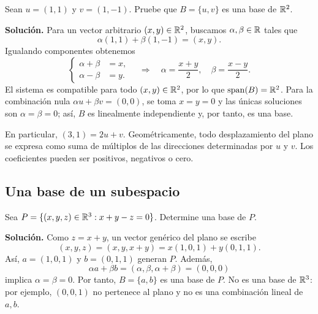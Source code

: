 \documentclass[compacto,10pt]{pubciencias-notas}
\begin{document}
\begin{ejem}\label{sem10cl01:planoR2}
    Sean $u=(1,1)$ y $v=(1,-1)$. Pruebe que $B=\{u,v\}$ es una base
    de $\mathbb{R}^2$.

    \textbf{Solución.} Para un vector arbitrario $(x,y)\in\mathbb{R}^2$, buscamos
    $\alpha,\beta\in\mathbb{R}$ tales que
    \[
        \alpha(1,1)+\beta(1,-1)=(x,y).
    \]
    Igualando componentes obtenemos
    \[
        \left\{\begin{aligned}\alpha+\beta&=x,\\\alpha-\beta&=y.\end{aligned}\right.
        \quad\Longrightarrow\quad
        \alpha=\frac{x+y}{2},\quad\beta=\frac{x-y}{2}.
    \]
    El sistema es compatible para todo $(x,y)\in\mathbb{R}^2$, por lo que $\operatorname{span}(B)=\mathbb{R}^2$.
    Para la combinación nula $\alpha u+\beta v=(0,0)$, se toma
    $x=y=0$ y las únicas soluciones son
    $\alpha=\beta=0$; así, $B$ es linealmente independiente y, por tanto,
    es una base.

    En particular, $(3,1)=2u+v$. Geométricamente, todo desplazamiento del
    plano se expresa como suma de múltiplos de las direcciones determinadas
    por $u$ y $v$. Los coeficientes pueden ser positivos, negativos o cero.
\end{ejem}

\begin{center}
\end{center}

\subsection{Una base de un subespacio}

\begin{ejem}\label{sem10cl01:planoR3}
    Sea $P=\{(x,y,z)\in\mathbb{R}^3:x+y-z=0\}$. Determine una base de $P$.

    \textbf{Solución.} Como $z=x+y$, un vector genérico del plano se
    escribe
    \[
        (x,y,z)=(x,y,x+y)=x(1,0,1)+y(0,1,1).
    \]
    Así, $a=(1,0,1)$ y $b=(0,1,1)$ generan $P$. Además,
    \[
        \alpha a+\beta b=(\alpha,\beta,\alpha+\beta)=(0,0,0)
    \]
    implica $\alpha=\beta=0$. Por tanto, $B=\{a,b\}$ es una base de $P$.
    No es una base de $\mathbb{R}^3$: por ejemplo, $(0,0,1)$ no pertenece al plano
    y no es una combinación lineal de $a,b$.
\end{ejem}
\end{document}

